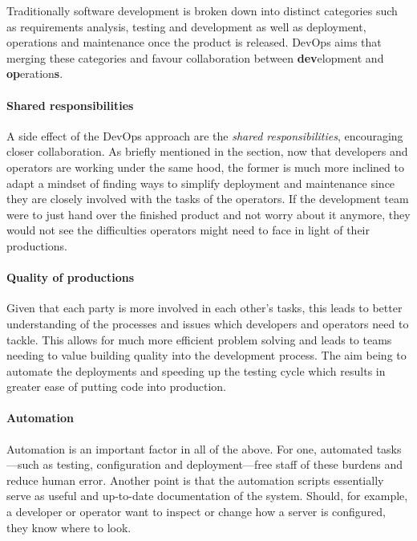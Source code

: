 Traditionally software development is broken down into distinct
categories such as requirements analysis, testing and development as
well as deployment, operations and maintenance once the product is
released. DevOps aims that merging these categories and favour
collaboration between \textbf{dev}elopment and
\textbf{op}eration\textbf{s}.

\paragraph{Shared responsibilities}

A side effect of the DevOps approach are the \textit{shared
responsibilities}, encouraging closer collaboration. As briefly
mentioned in the  section, now that
developers and operators are working under the same hood, the former
is much more inclined to adapt a mindset of finding ways to simplify
deployment and maintenance since they are closely involved with the
tasks of the operators. If the development team were to just hand over
the finished product and not worry about it anymore, they would not
see the difficulties operators might need to face in light of their
productions.

\paragraph{Quality of productions}

Given that each party is more involved in each other's tasks, this
leads to better understanding of the processes and issues which
developers and operators need to tackle. This allows for much more
efficient problem solving and leads to teams needing to value building
quality into the development process. The aim being to automate the
deployments and speeding up the testing cycle which results in greater
ease of putting code into production.

\paragraph{Automation}

Automation is an important factor in all of the above. For one,
automated tasks---such as testing, configuration and deployment---free
staff of these burdens and reduce human error. Another point is that
the automation scripts essentially serve as useful and up-to-date
documentation of the system. Should, for example, a developer or
operator want to inspect or change how a server is configured, they
know where to look.


